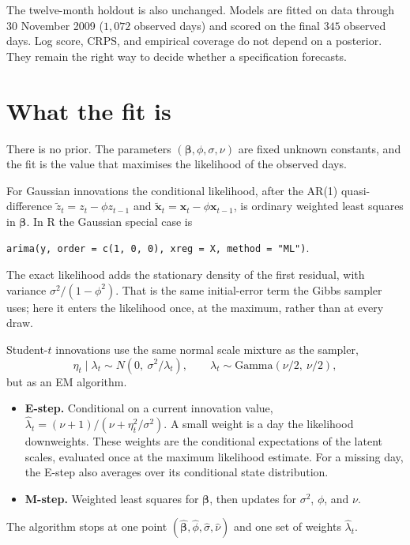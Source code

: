 \documentclass[11pt]{article}
\newcommand{\code}[1]{\texttt{\small #1}}
\begin{document}
The twelve-month holdout is also unchanged. Models are fitted on data through
30 November 2009 ($1{,}072$ observed days) and scored on the final $345$
observed days. Log score, CRPS, and empirical coverage do not depend on a
posterior. They remain the right way to decide whether a specification
forecasts.

\section{What the fit is}

There is no prior. The parameters
$(\boldsymbol\beta, \phi, \sigma, \nu)$ are fixed unknown constants, and the
fit is the value that maximises the likelihood of the observed days.

For Gaussian innovations the conditional likelihood, after the AR(1)
quasi-difference
$\tilde z_t = z_t - \phi z_{t-1}$ and
$\tilde{\mathbf{x}}_t = \mathbf{x}_t - \phi \mathbf{x}_{t-1}$,
is ordinary weighted least squares in $\boldsymbol\beta$. In R the Gaussian
special case is
\begin{center}
\code{arima(y, order = c(1, 0, 0), xreg = X, method = "ML")}.
\end{center}
The exact likelihood adds the stationary density of the first residual,
with variance $\sigma^2/(1-\phi^2)$. That is the same initial-error term the
Gibbs sampler uses; here it enters the likelihood once, at the maximum, rather
than at every draw.

Student-$t$ innovations use the same normal scale mixture as the sampler,
\[
\eta_t \mid \lambda_t \sim N\!\left(0,\ \sigma^2/\lambda_t\right),
\qquad
\lambda_t \sim \mathrm{Gamma}(\nu/2,\ \nu/2),
\]
but as an EM algorithm.
\begin{itemize}
\item \textbf{E-step.} Conditional on a current innovation value,
$\hat\lambda_t = (\nu+1)/(\nu + \eta_t^2/\sigma^2)$.
A small weight is a day the likelihood downweights. These weights are the
conditional expectations of the latent scales, evaluated once at the maximum
likelihood estimate. For a missing day, the E-step also averages over its
conditional state distribution.
\item \textbf{M-step.} Weighted least squares for $\boldsymbol\beta$, then
updates for $\sigma^2$, $\phi$, and $\nu$.
\end{itemize}
The algorithm stops at one point
$(\hat{\boldsymbol\beta},\hat\phi,\hat\sigma,\hat\nu)$ and one set of weights
$\hat\lambda_t$.
\end{document}
